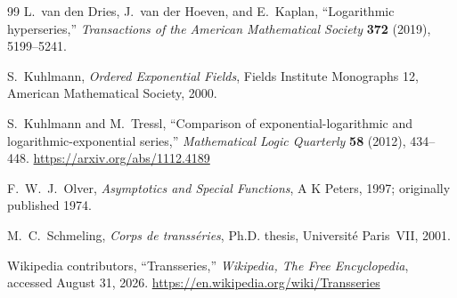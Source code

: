 \documentclass[11pt,openany]{book}
\theoremstyle{plain}
\theoremstyle{definition}
\theoremstyle{remark}
\begin{document}
\begin{thebibliography}{99}
L.~van den Dries, J.~van der Hoeven, and E.~Kaplan,
``Logarithmic hyperseries,''
\emph{Transactions of the American Mathematical Society} \textbf{372} (2019), 5199--5241.

S.~Kuhlmann,
\emph{Ordered Exponential Fields},
Fields Institute Monographs 12, American Mathematical Society, 2000.

S.~Kuhlmann and M.~Tressl,
``Comparison of exponential-logarithmic and logarithmic-exponential series,''
\emph{Mathematical Logic Quarterly} \textbf{58} (2012), 434--448.
\url{https://arxiv.org/abs/1112.4189}

F.~W.~J.~Olver,
\emph{Asymptotics and Special Functions},
A K Peters, 1997; originally published 1974.

M.~C.~Schmeling,
\emph{Corps de transs\'eries},
Ph.D. thesis, Universit\'e Paris~VII, 2001.

Wikipedia contributors,
``Transseries,'' \emph{Wikipedia, The Free Encyclopedia},
accessed August 31, 2026.
\url{https://en.wikipedia.org/wiki/Transseries}

\end{thebibliography}
\end{document}

